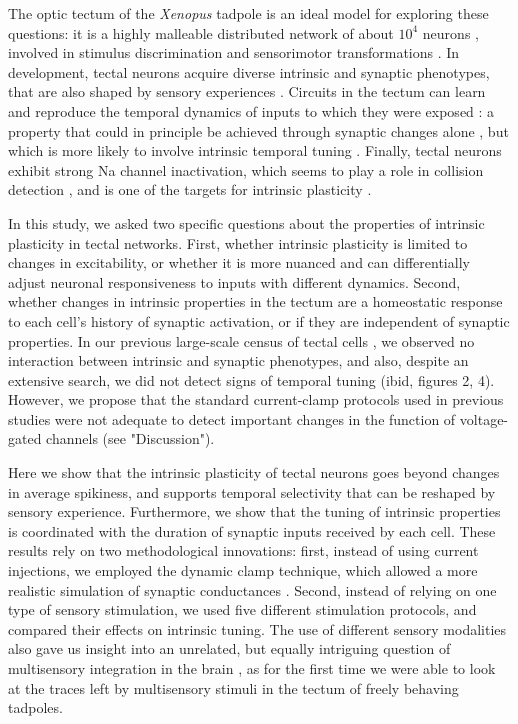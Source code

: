 \documentclass{article}
\begin{document}
The optic tectum of the \textit{Xenopus} tadpole is an ideal model for exploring these questions: it is a highly malleable distributed network of about $10^4$ neurons \citep{pratt2013}, involved in stimulus discrimination and sensorimotor transformations \citep{dong2009,khakhalin2014}. In development, tectal neurons acquire diverse intrinsic and synaptic phenotypes, that are also shaped by sensory experiences \citep{xu2011,ciarleglio2015}. Circuits in the tectum can learn and reproduce the temporal dynamics of inputs to which they were exposed \citep{pratt2008}: a property that could in principle be achieved through synaptic changes alone \citep{lukovsevivcius2009}, but which is more likely to involve intrinsic temporal tuning \citep{narayanan2008,beatty2014}. Finally, tectal neurons exhibit strong Na channel inactivation, which seems to play a role in collision detection \citep{jang2016}, and is one of the targets for intrinsic plasticity \citep{bianchi2012}.

In this study, we asked two specific questions about the properties of intrinsic plasticity in tectal networks. First, whether intrinsic plasticity is limited to changes in excitability, or whether it is more nuanced and can differentially adjust neuronal responsiveness to inputs with different dynamics. Second, whether changes in intrinsic properties in the tectum are a homeostatic response to each cell's history of synaptic activation, or if they are independent of synaptic properties. In our previous large-scale census of tectal cells \citep{ciarleglio2015}, we observed no interaction between intrinsic and synaptic phenotypes, and also, despite an extensive search, we did not detect signs of temporal tuning (ibid,  figures 2, 4). However, we propose that the standard current-clamp protocols used in previous studies \citep{pratt2007,hamodi2014} were not adequate to detect important changes in the function of voltage-gated channels (see "Discussion"). 

Here we show that the intrinsic plasticity of tectal neurons goes beyond changes in average spikiness, and supports temporal selectivity that can be reshaped by sensory experience. Furthermore, we show that the tuning of intrinsic properties is coordinated with the duration of synaptic inputs received by each cell. These results rely on two methodological innovations: first, instead of using current injections, we employed the dynamic clamp technique, which allowed a more realistic simulation of synaptic conductances \citep{prinz2004}. Second, instead of relying on one type of sensory stimulation, we used five different stimulation protocols, and compared their effects on intrinsic tuning. The use of different sensory modalities also gave us insight into an unrelated, but equally intriguing question of multisensory integration in the brain \citep{deeg2009,felch2016,truszkowski2017}, as for the first time we were able to look at the traces left by multisensory stimuli in the tectum of freely behaving tadpoles.
\end{document}
